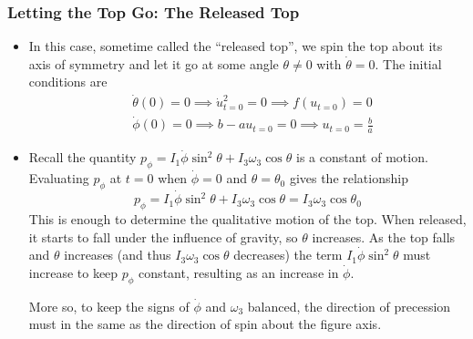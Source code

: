 \documentclass[11pt, a4paper]{article}
\begin{document}
\subsubsection{Letting the Top Go: The Released Top}
\begin{itemize}
	\item In this case, sometime called the ``released top'', we spin the top about its axis of symmetry and let it go at some angle $ \theta \neq 0 $ with $ \dot{\theta} = 0 $. The initial conditions are
	\begin{align*}
		&\dot{\theta}(0) = 0 \implies \dot{u}_{t=0}^{2} = 0 \implies f(u_{t=0}) = 0 \\
		&\dot{\phi}(0) = 0 \implies b - au_{t=0} = 0 \implies u_{t=0} = \frac{b}{a}
	\end{align*}
	
	\item Recall the quantity $ p_{\phi} = I_{1} \dot{\phi} \sin^{2} \theta + I_{3} \omega_{3} \cos \theta $ is a constant of motion. Evaluating $ p_{\phi} $ at $ t = 0 $ when $ \dot{\phi} = 0 $ and $ \theta = \theta_{0} $ gives the relationship
	\begin{equation*}
		p_{\phi} = I_{1} \dot{\phi} \sin^{2} \theta + I_{3} \omega_{3} \cos \theta = I_{3} \omega_{3} \cos \theta_{0}
	\end{equation*}
	This is enough to determine the qualitative motion of the top. When released, it starts to fall under the influence of gravity, so $ \theta $ increases. As the top falls and $ \theta $ increases (and thus $ I_{3}\omega_{3} \cos \theta $ decreases) the term $ I_{1}\dot{\phi}\sin^{2}\theta $ must increase to keep $ p_{\phi} $ constant, resulting as an increase in $ \dot \phi $. 
	
	More so, to keep the signs of $ \dot{\phi} $ and $ \omega_{3} $ balanced, the direction of precession must in the same as the direction of spin about the figure axis.
	
	
\end{itemize}
\end{document}
